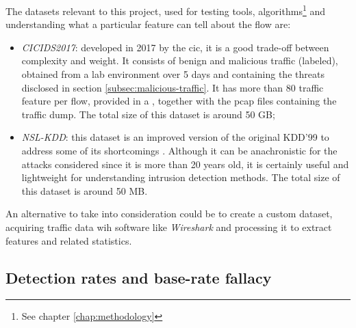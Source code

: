 \noindent The datasets relevant to this project, used for testing tools, algorithms\footnote{See chapter \ref{chap:methodology}} and understanding what a particular feature can tell about the flow are: 
\begin{itemize}
    \item[\faCaretRight] \textit{CICIDS2017}: developed in 2017 by the \gls{cic}, it is a good trade-off between complexity and weight. It consists of benign and malicious traffic (labeled), obtained from a lab environment over 5 days and containing the threats disclosed in section \ref{subsec:malicious-traffic}. It has more than 80 traffic feature per flow, provided in a , together with the \gls{pcap} files containing the traffic dump. The total size of this dataset is around 50 GB;
    \item[\faCaretRight] \textit{NSL-KDD}: this dataset is an improved version of the original KDD'99 \cite{Tavallaee2009} to address some of its shortcomings \cite{McHugh2000}. Although it can be anachronistic for the attacks considered since it is more than 20 years old, it is certainly useful and lightweight for understanding intrusion detection methods. The total size of this dataset is around 50 MB.
\end{itemize}

\noindent An alternative to take into consideration could be to create a custom dataset, acquiring traffic data wih software like \textit{Wireshark} \cite{WiresharkWebsite} and processing it to extract features and related statistics.


\subsection{Detection rates and base-rate fallacy}
\label{subsec:detection-rates}

